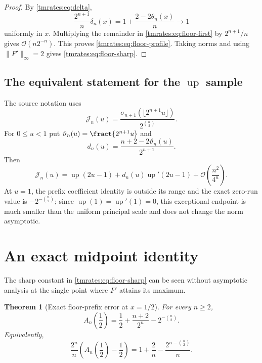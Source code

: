 \documentclass[11pt,oneside]{article}
\newtheorem{theorem}{Theorem}[section]
\theoremstyle{definition}
\theoremstyle{remark}
\newcommand{\Up}{\operatorname{up}}
\newcommand{\bigO}{\mathcal O}
\begin{document}
\begin{proof}
By \eqref{tmrates:eq:delta},
\[
 \frac{2^{n+1}}n\delta_n(x)
 =1+\frac{2-2\theta_n(x)}n\longrightarrow1
\]
uniformly in $x$.  Multiplying the remainder in \eqref{tmrates:eq:floor-first} by
$2^{n+1}/n$ gives $\bigO(n2^{-n})$.  This proves \eqref{tmrates:eq:floor-profile}.  Taking norms and
using $\|F'\|_\infty=2$ gives \eqref{tmrates:eq:floor-sharp}.
\end{proof}

\subsection{The equivalent statement for the \texorpdfstring{$\Up$}{Up} sample}

The source notation uses
\begin{equation}
 \mathcal J_n(u)
 =\frac{\sigma_{n+1}(\lfloor2^{n+1}u\rfloor)}{2^{\binom n2}}.
\end{equation}
For $0\le u<1$ put $\vartheta_n(u)=\fract{2^{n+1}u}$ and
\begin{equation}
 d_n(u)=\frac{n+2-2\vartheta_n(u)}{2^{n+1}}.
\end{equation}
Then
\begin{equation}
 \mathcal J_n(u)
 =\Up(2u-1)+d_n(u)\Up'(2u-1)
  +\bigO\!\left(\frac{n^2}{4^n}\right).                  \label{tmrates:eq:J-expansion}
\end{equation}
At $u=1$, the prefix coefficient identity is outside its range and the exact zero-run value is
$-2^{-\binom n2}$; since $\Up(1)=\Up'(1)=0$, this exceptional endpoint is much smaller than
the uniform principal scale and does not change the norm asymptotic.

\section{An exact midpoint identity}
\label{tmrates:sec:midpoint}

The sharp constant in \eqref{tmrates:eq:floor-sharp} can be seen without asymptotic analysis at the
single point where $F'$ attains its maximum.

\begin{theorem}[Exact floor-prefix error at $x=1/2$]
\label{tmrates:thm:midpoint-exact}
For every $n\ge2$,
\begin{equation}
 A_n\!\left(\frac12\right)
 =\frac12+\frac{n+2}{2^n}-2^{-\binom n2}.                 \label{tmrates:eq:midpoint-exact}
\end{equation}
Equivalently,
\begin{equation}
 \frac{2^n}{n}
 \left(A_n\!\left(\frac12\right)-\frac12\right)
 =1+\frac2n-\frac{2^{n-\binom n2}}n.                     \label{tmrates:eq:midpoint-scaled}
\end{equation}
\end{theorem}
\end{document}
